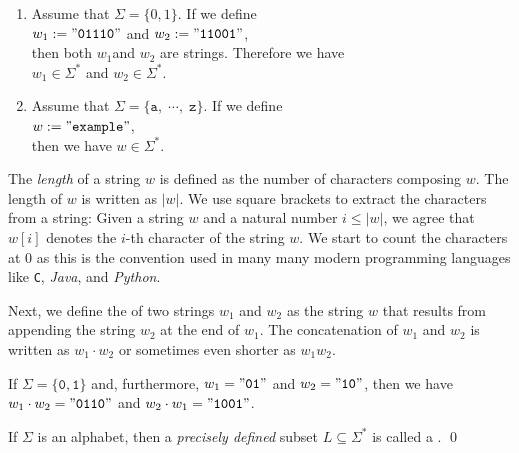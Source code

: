 \examplesEng
\begin{enumerate}
\item Assume that $\Sigma = \{0, 1\}$.  If we define
      \\[0.2cm]
      \hspace*{1.3cm}
      $w_1 := \mathtt{\symbol{34}01110\symbol{34}}$ \quad and \quad $w_2 := \mathtt{\symbol{34}11001\symbol{34}}$,
      \\[0.2cm]
      then both $w_1$and $w_2$ are strings.  Therefore we have
      \\[0.2cm]
      \hspace*{1.3cm}
      $w_1 \in \Sigma^*$ \quad and \quad $w_2 \in \Sigma^*$.
\item Assume that $\Sigma = \{\mathtt{a}, \;\cdots\!,\; \mathtt{z}\}$.   If we define
      \\[0.2cm]
      \hspace*{1.3cm}
      $w := \mathtt{\symbol{34}example}\symbol{34}$,
      \\[0.2cm]
      then we have $w \in \Sigma^*$. \eox
\end{enumerate}
The \emph{length} of a string $w$ is defined as the number of characters composing $w$.
The length of $w$ is written as $|w|$.    We use square brackets to extract the characters from a string:
Given a string $w$ and a natural number $i \leq |w|$, we agree that $w[i]$ denotes the $i$-th
character of the string $w$.   We start to count the characters at 0 as this is the convention used in many
many modern programming languages like \texttt{C}, \textsl{Java}, and \textsl{Python}.

Next, we define the   of two strings $w_1$ and $w_2$ as the string $w$ that
results from appending the string $w_2$ at the end of  $w_1$.  The concatenation of $w_1$ and $w_2$
is written as $w_1 \cdot w_2$ or sometimes even shorter as $w_1w_2$.  
\vspace*{0.3cm}

\exampleEng
If $\Sigma = \{\mathtt{0},\mathtt{1}\}$ and, furthermore,  $w_1 = \mathtt{\symbol{34}01\symbol{34}}$ and $w_2 = \mathtt{\symbol{34}10\symbol{34}}$, then we have
\\[0.2cm]
\hspace*{1.3cm}
$w_1 \cdot w_2 = \mathtt{\symbol{34}0110\symbol{34}}$ \quad and \quad $w_2 \cdot w_1 = \mathtt{\symbol{34}1001\symbol{34}}$.  \eox

\begin{Definition} \hspace*{\fill} \linebreak
If $\Sigma$ is an alphabet, then a \emph{precisely defined} subset $L \subseteq \Sigma^*$
is called a .  \qed
\end{Definition}

